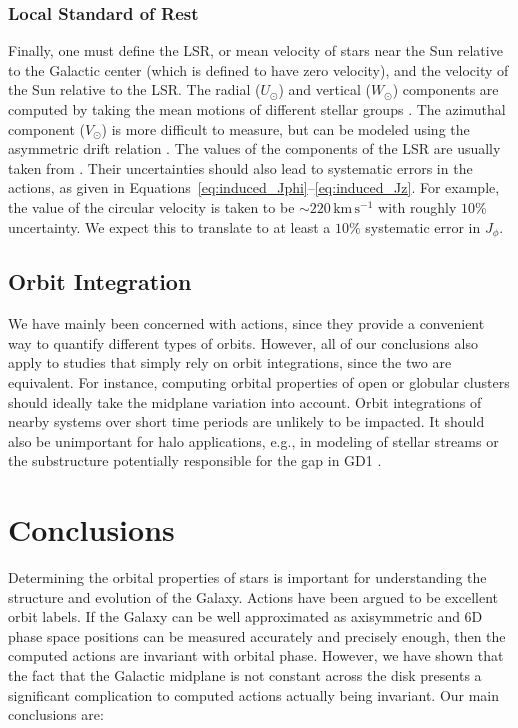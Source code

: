 \documentclass[twocolumn]{aastex62}
\newcommand{\kms}{\text{km}\,\text{s}^{-1}}
\begin{document}
\subsubsection{Local Standard of Rest}
Finally, one must define the LSR, or mean velocity of stars near the Sun
relative to the Galactic center (which is defined to have zero velocity), and
the velocity of the Sun relative to the LSR. The radial ($U_{\odot}$) and
vertical ($W_{\odot}$) components are computed by taking the mean motions of
different stellar groups \citep[e.g.,][]{2012MNRAS.427..274S}. The azimuthal
component ($V_{\odot}$) is more difficult to measure, but can be modeled using
the asymmetric drift relation \citep{2008gady.book.....B}. The values of the
components of the LSR are usually taken from \citet{2010MNRAS.403.1829S}. Their uncertainties should also lead to systematic errors in the actions, as given in Equations~\eqref{eq:induced_Jphi}--\eqref{eq:induced_Jz}. For example, the
value of the circular velocity is taken to be $\sim 220\,\kms$
\citep[e.g.,][]{2012ApJ...759..131B} with roughly $10\%$ uncertainty. We expect this to translate to at least a $10\%$ systematic error in $J_{\phi}$.

\subsection{Orbit Integration}\label{ssec:orbit_integrate}
We have mainly been concerned with actions, since they provide a convenient
way to quantify different types of orbits. However, all of our conclusions also apply to studies that 
simply rely on orbit integrations, since the two
are equivalent. For instance, computing orbital properties of open or globular
clusters \citep[e.g.,][]{2016A&A...588A.120C, 2018A&A...615A..49C,
2018A&A...616A..12G} should ideally take the midplane variation into account.
Orbit integrations of nearby systems over short time periods
\citep[e.g.,][]{2014MNRAS.445.2169M, 2018A&A...616A..37B} are unlikely to be impacted. It should
also be unimportant for halo applications, e.g., in modeling of
stellar streams \citep[e.g.,][]{2014ApJ...795...95B} or the substructure
potentially responsible for the gap in GD1 \citep{2018arXiv181103631B}.

\section{Conclusions}\label{sec:conclusion}
Determining the orbital properties of stars is important for
understanding the structure and evolution of the Galaxy. Actions have been argued to be 
excellent orbit labels. If the Galaxy can be well
approximated as axisymmetric and 6D phase space positions can be measured
accurately and precisely enough, then the computed actions are invariant with
orbital phase. However, we have shown that the fact that the Galactic midplane
is not constant across the disk presents a significant complication to
computed actions actually being invariant. Our main conclusions are:
\end{document}
